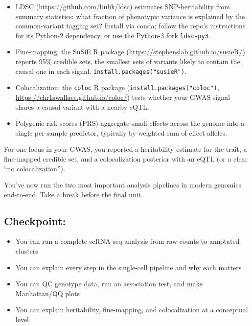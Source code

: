 \begin{itemize}[nosep]
  \item LDSC (\url{https://github.com/bulik/ldsc}) estimates SNP-heritability from summary statistics: what fraction of phenotypic variance is explained by the common-variant tagging set? Install via conda; follow the repo's instructions for its Python-2 dependency, or use the Python-3 fork \texttt{ldsc-py3}.
  \item Fine-mapping: the SuSiE R package (\url{https://stephenslab.github.io/susieR/}) reports 95\% credible sets, the smallest sets of variants likely to contain the causal one in each signal. \texttt{install.packages("susieR")}.
  \item Colocalization: the \texttt{coloc} R package (\texttt{install.packages("coloc")}, \url{https://chr1swallace.github.io/coloc/}) tests whether your GWAS signal shares a causal variant with a nearby eQTL.
  \item Polygenic risk scores (PRS) aggregate small effects across the genome into a single per-sample predictor, typically by weighted sum of effect alleles.
\end{itemize}
\begin{winbox}[Checkpoint]
For one locus in your GWAS, you reported a heritability estimate for the trait, a fine-mapped credible set, and a colocalization posterior with an eQTL (or a clear ``no colocalization'').
\end{winbox}

\begin{restbox}
You've now run the two most important analysis pipelines in modern genomics end-to-end. Take a break before the final unit.
\end{restbox}

\subsection{Checkpoint:}
\begin{itemize}[nosep]
  \item You can run a complete scRNA-seq analysis from raw counts to annotated clusters
  \item You can explain every step in the single-cell pipeline and why each matters
  \item You can QC genotype data, run an association test, and make Manhattan/QQ plots
  \item You can explain heritability, fine-mapping, and colocalization at a conceptual level
\end{itemize}

